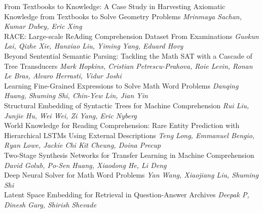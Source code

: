 \documentclass{book}
\begin{document}
    
    \noindent	From Textbooks to Knowledge: A Case Study in Harvesting Axiomatic Knowledge from Textbooks to Solve Geometry Problems \newline 
    {\itshape Mrinmaya Sachan, Kumar Dubey, Eric Xing} \\
    
    \noindent	RACE: Large-scale ReAding Comprehension Dataset From Examinations \newline 
    {\itshape Guokun Lai, Qizhe Xie, Hanxiao Liu, Yiming Yang, Eduard Hovy} \\
    
    \noindent	Beyond Sentential Semantic Parsing: Tackling the Math SAT with a Cascade of Tree Transducers \newline 
    {\itshape Mark Hopkins, Cristian Petrescu-Prahova, Roie Levin, Ronan Le Bras, Alvaro Herrasti, Vidur Joshi} \\
    
    \noindent	Learning Fine-Grained Expressions to Solve Math Word Problems \newline 
    {\itshape Danqing Huang, Shuming Shi, Chin-Yew Lin, Jian Yin} \\
    
    \noindent	Structural Embedding of Syntactic Trees for Machine Comprehension \newline 
    {\itshape Rui Liu, Junjie Hu, Wei Wei, Zi Yang, Eric Nyberg} \\
    
    \noindent	World Knowledge for Reading Comprehension: Rare Entity Prediction with Hierarchical LSTMs Using External Descriptions \newline 
    {\itshape Teng Long, Emmanuel Bengio, Ryan Lowe, Jackie Chi Kit Cheung, Doina Precup} \\
    
    \noindent	Two-Stage Synthesis Networks for Transfer Learning in Machine Comprehension \newline 
    {\itshape David Golub, Po-Sen Huang, Xiaodong He, Li Deng} \\
    
    \noindent	Deep Neural Solver for Math Word Problems \newline 
    {\itshape Yan Wang, Xiaojiang Liu, Shuming Shi} \\
    
    \noindent	Latent Space Embedding for Retrieval in Question-Answer Archives \newline 
    {\itshape Deepak P, Dinesh Garg, Shirish Shevade} \\
    
\end{document}
